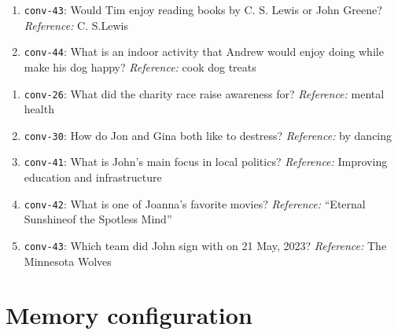 \begin{description}
\begin{enumerate}
    \item \texttt{conv-43}: Would Tim enjoy reading books by C. S. Lewis or John Greene? \emph{Reference:} C. S.Lewis
    \item \texttt{conv-44}: What is an indoor activity that Andrew would enjoy doing while make his dog happy? \emph{Reference:} cook dog treats
  \end{enumerate}
  \item[Single-hop (Category 4)]
  \begin{enumerate}
    \item \texttt{conv-26}: What did the charity race raise awareness for? \emph{Reference:} mental health
    \item \texttt{conv-30}: How do Jon and Gina both like to destress? \emph{Reference:} by dancing
    \item \texttt{conv-41}: What is John's main focus in local politics? \emph{Reference:} Improving education and infrastructure
    \item \texttt{conv-42}: What is one of Joanna's favorite movies? \emph{Reference:} ``Eternal Sunshineof the Spotless Mind''
    \item \texttt{conv-43}: Which team did John sign with on 21 May, 2023? \emph{Reference:} The Minnesota Wolves
  \end{enumerate}
\end{description}

\section{Memory configuration}
\label{app:repro_memory}

